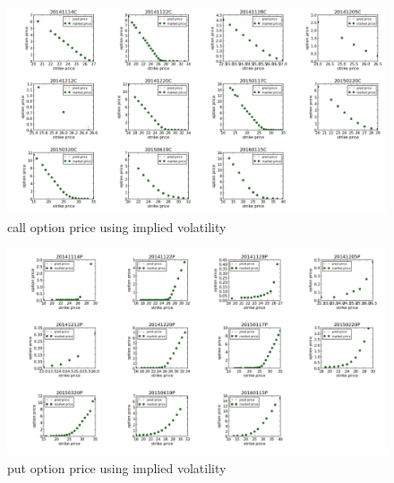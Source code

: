 \begin{landscape}
\begin{figure}[H]
\centering
\includegraphics[width=\linewidth]{imVolaCall.png}
\caption{call option price using implied volatility}
\end{figure}
\begin{figure}[H]
\centering
\includegraphics[width=\linewidth]{imVolaPut.png}
\caption{put option price using implied volatility}
\end{figure}
\end{landscape}



